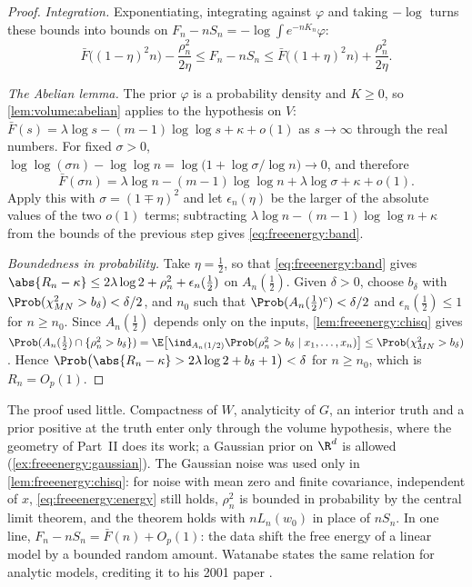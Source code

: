 \begin{refsection}
\begin{proof}
\emph{Integration.} Exponentiating, integrating against $\varphi$ and taking $-\log$ turns these bounds into bounds on $F_n-nS_n=-\log\int e^{-nK_n}\varphi$:
\[
\bar F\bigl((1-\eta)^2n\bigr)-\frac{\rho_n^2}{2\eta}\le F_n-nS_n\le\bar F\bigl((1+\eta)^2n\bigr)+\frac{\rho_n^2}{2\eta}.
\]

\emph{The Abelian lemma.} The prior $\varphi$ is a probability density and $K\ge0$, so \cref{lem:volume:abelian} applies to the hypothesis on $V$: $\bar F(s)=\lambda\log s-(m-1)\log\log s+\kappa+o(1)$ as $s\to\infty$ through the real numbers. For fixed $\sigma>0$, $\log\log(\sigma n)-\log\log n=\log\bigl(1+\log\sigma/\log n\bigr)\to0$, and therefore
\[
\bar F(\sigma n)=\lambda\log n-(m-1)\log\log n+\lambda\log\sigma+\kappa+o(1).
\]
Apply this with $\sigma=(1\mp\eta)^2$ and let $\epsilon_n(\eta)$ be the larger of the absolute values of the two $o(1)$ terms; subtracting $\lambda\log n-(m-1)\log\log n+\kappa$ from the bounds of the previous step gives \eqref{eq:freeenergy:band}.

\emph{Boundedness in probability.} Take $\eta=\frac12$, so that \eqref{eq:freeenergy:band} gives $\abs{R_n-\kappa}\le2\lambda\log2+\rho_n^2+\epsilon_n(\tfrac12)$ on $A_n(\tfrac12)$. Given $\delta>0$, choose $b_\delta$ with $\Prob(\chi^2_{MN}>b_\delta)<\delta/2$, and $n_0$ such that $\Prob(A_n(\tfrac12)^c)<\delta/2$ and $\epsilon_n(\tfrac12)\le1$ for $n\ge n_0$. Since $A_n(\tfrac12)$ depends only on the inputs, \cref{lem:freeenergy:chisq} gives $\Prob(A_n(\tfrac12)\cap\{\rho_n^2>b_\delta\})=\E\bigl[\ind_{A_n(1/2)}\Prob(\rho_n^2>b_\delta\mid x_1,\dots,x_n)\bigr]\le\Prob(\chi^2_{MN}>b_\delta)$. Hence $\Prob\bigl(\abs{R_n-\kappa}>2\lambda\log2+b_\delta+1\bigr)<\delta$ for $n\ge n_0$, which is $R_n=O_p(1)$.
\end{proof}

The proof used little. Compactness of $W$, analyticity of $G$, an interior truth and a prior positive at the truth enter only through the volume hypothesis, where the geometry of Part~II does its work; a Gaussian prior on $\R^d$ is allowed (\cref{ex:freeenergy:gaussian}). The Gaussian noise was used only in \cref{lem:freeenergy:chisq}: for noise with mean zero and finite covariance, independent of $x$, \eqref{eq:freeenergy:energy} still holds, $\rho_n^2$ is bounded in probability by the central limit theorem, and the theorem holds with $nL_n(w_0)$ in place of $nS_n$. In one line, $F_n-nS_n=\bar F(n)+O_p(1)$: the data shift the free energy of a linear model by a bounded random amount. Watanabe states the same relation for analytic models, crediting it to his 2001 paper \parencite[\S7.3]{Watanabe2013}.


\end{refsection}
